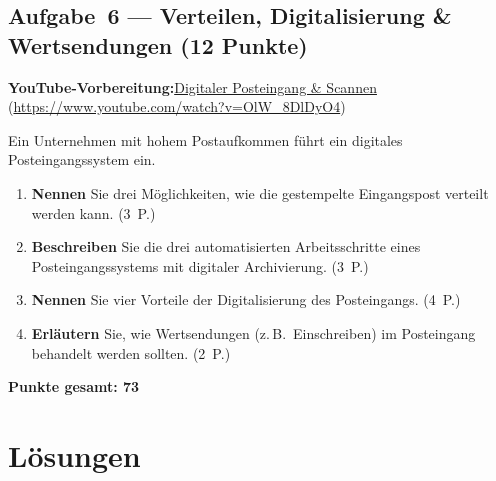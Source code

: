 \documentclass[11pt, a4paper]{article}
\begin{document}
\subsection*{Aufgabe~6 --- Verteilen, Digitalisierung \& Wertsendungen (12 Punkte)}

\noindent\textbf{\color{bfwAccent}YouTube-Vorbereitung:}\enspace \href{https://www.youtube.com/watch?v=OlW_8DlDyO4}{Digitaler Posteingang \& Scannen} (\url{https://www.youtube.com/watch?v=OlW_8DlDyO4})

\medskip
Ein Unternehmen mit hohem Postaufkommen führt ein digitales Posteingangssystem ein.

\begin{enumerate}[label=(\alph*)]
  \item \textbf{Nennen} Sie drei Möglichkeiten, wie die gestempelte Eingangspost verteilt werden kann. \hfill (3~P.)
  \item \textbf{Beschreiben} Sie die drei automatisierten Arbeitsschritte eines Posteingangssystems mit digitaler Archivierung. \hfill (3~P.)
  \item \textbf{Nennen} Sie vier Vorteile der Digitalisierung des Posteingangs. \hfill (4~P.)
  \item \textbf{Erläutern} Sie, wie Wertsendungen (z.\,B.\ Einschreiben) im Posteingang behandelt werden sollten. \hfill (2~P.)
\end{enumerate}

\vspace{1em}
\noindent\textbf{Punkte gesamt: 73}

\newpage

\section{Lösungen}\label{loesungen}
\end{document}
